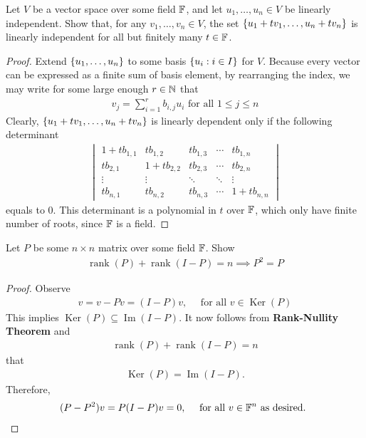 \documentclass{report}
\begin{document}
\begin{question}{}{}
Let $V$ be a vector space over some field  $\mathbb{F}$, and let  $u_1,\dots ,u_n \in V$ be linearly independent. Show that, for any $v_1,\dots ,v_n \in V$, the set $\left\{ u_1+t v_1, \dots ,u_n+ t v_n \right\}$ is linearly independent for all but finitely many $t \in \mathbb{F}$.  
\end{question}
\begin{proof}
Extend $\left\{ u_1,\dots ,u_n \right\}$ to some basis  $\left\{ u_i:i \in I \right\}$ for $V$. Because every vector can be expressed as a finite sum of basis element, by rearranging the index, we may write  for some large enough $r\in\mathbb{N}$ that 
 \begin{align*}
v_j= \sum_{i=1}^r b_{i,j}u_i\text{ for all }1\leq j \leq n
\end{align*}
Clearly, $\left\{ u_1+t v_1,\dots ,u_n+t v_n \right\}$ is linearly dependent only if the following determinant  
\begin{align*}
\begin{vmatrix} 
  1+t b_{1,1} & t b_{1,2} & t b_{1,3} & \cdots  & t b_{1,n} \\
  t b_{2,1} & 1+ t b_{2,2} & t b_{2,3} & \cdots &t b_{2,n}  \\
  \vdots & \vdots & \ddots & \ddots &\vdots  \\
  t b_{n,1} & t b_{n,2} & t b_{n,3} & \cdots  & 1+t b_{n,n}
\end{vmatrix} 
\end{align*}
equals to $0$. This determinant is a polynomial in $t$ over $\mathbb{F}$, which only have finite number of roots, since $\mathbb{F}$ is a field. 
\end{proof}
\begin{question}{}{}
Let $P$ be some  $n\times n$ matrix over some field $\mathbb{F}$. Show 
\begin{align*}
\operatorname{rank}(P)+\operatorname{rank}(I-P)= n \implies P^2=P
\end{align*}
\end{question}
\begin{proof}
Observe 
\begin{align*}
v=v- Pv= (I-P)v,\quad\text{ for all }v \in \operatorname{Ker}(P)
\end{align*}
This implies $\operatorname{Ker}(P)\subseteq \operatorname{Im}(I-P)$. It now follows from \textbf{Rank-Nullity Theorem} and  
\begin{align*}
\operatorname{rank}(P) + \operatorname{rank}(I-P)=n 
\end{align*}
that
\begin{align*}
\operatorname{Ker}(P)=\operatorname{Im}(I-P). 
\end{align*}
Therefore, 
\begin{align*}
  (P-P^2)v=P(I-P)v=0,\quad \text{ for all }v \in \mathbb{F}^n\text{ as desired. }
\end{align*}
\end{proof}
\end{document}
